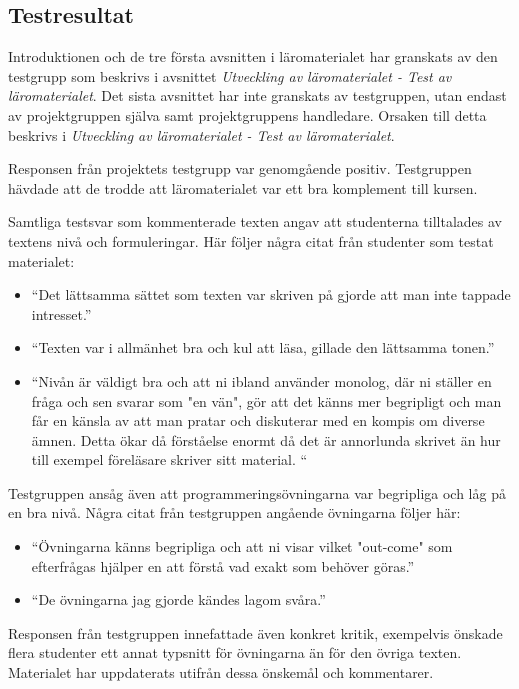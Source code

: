 \documentclass[]{article}
\begin{document}
\subsection{Testresultat}
Introduktionen och de tre första avsnitten i läromaterialet har granskats av den testgrupp som beskrivs i avsnittet
\textit{Utveckling av läromaterialet - Test av läromaterialet}. Det sista avsnittet har inte granskats av testgruppen,
utan endast av projektgruppen själva samt projektgruppens handledare. Orsaken till detta beskrivs i
\textit{Utveckling av läromaterialet - Test av läromaterialet}.

Responsen från projektets testgrupp var genomgående positiv. Testgruppen hävdade att de trodde att läromaterialet var
ett bra komplement till kursen.

Samtliga testsvar som kommenterade texten angav att studenterna tilltalades av textens nivå och formuleringar. Här
följer några citat från studenter som testat materialet:
\begin{itemize}
  \item “Det lättsamma sättet som texten var skriven på gjorde att man inte tappade intresset.”
  \item “Texten var i allmänhet bra och kul att läsa, gillade den lättsamma tonen.”
  \item “Nivån är väldigt bra och att ni ibland använder monolog, där ni ställer en fråga och sen svarar som "en vän",
  gör att det känns mer begripligt och man får en känsla av att man pratar och diskuterar med en kompis om diverse ämnen.
  Detta ökar då förståelse enormt då det är annorlunda skrivet än hur till exempel föreläsare skriver sitt material. “
\end{itemize}

Testgruppen ansåg även att programmeringsövningarna var begripliga och låg på en bra nivå. Några citat från testgruppen
angående övningarna följer här:
\begin{itemize}
  \item “Övningarna känns begripliga och att ni visar vilket "out-come" som efterfrågas hjälper en att förstå vad
  exakt som behöver göras.”
  \item “De övningarna jag gjorde kändes lagom svåra.”
  \end{itemize}

Responsen från testgruppen innefattade även konkret kritik, exempelvis önskade flera studenter ett annat typsnitt för
övningarna än för den övriga texten. Materialet har uppdaterats utifrån dessa önskemål och kommentarer.
\end{document}
